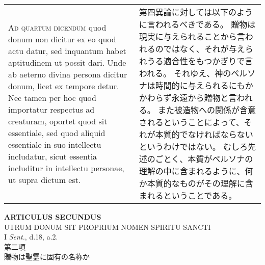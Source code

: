 \documentclass[10pt]{jsarticle} %
\begin{document}
\begin{longtable}{p{21em}p{21em}}
\\

\textsc{Ad quartum dicendum} quod donum non dicitur ex eo quod actu datur, sed inquantum habet aptitudinem ut possit dari. Unde ab aeterno divina persona dicitur donum, licet ex tempore detur. Nec tamen per hoc quod importatur respectus ad creaturam, oportet quod sit essentiale, sed quod aliquid essentiale in suo intellectu includatur, sicut essentia includitur in intellectu personae, ut supra dictum est.



&

第四異論に対しては以下のように言われるべきである。
贈物は現実に与えられることから言われるのではなく、それが与えられうる適合性をもつかぎりで言われる。
それゆえ、神のペルソナは時間的に与えられるにもかかわらず永遠から贈物と言われる。
また被造物への関係が含意されるということによって、それが本質的でなければならないというわけではない。
むしろ先述のごとく、本質がペルソナの理解の中に含まれるように、何か本質的なものがその理解に含まれるということである。

\\


\end{longtable}

\newpage
{}
\begin{center}
 {\Large {\bf ARTICULUS SECUNDUS}}\\
 {\large UTRUM DONUM SIT PROPRIUM NOMEN SPIRITU SANCTI}\\
 {\footnotesize I \textit{Sent.}, d.18, a.2.}\\
 {\Large 第二項\\贈物は聖霊に固有の名称か}
\end{center}
\end{document}
